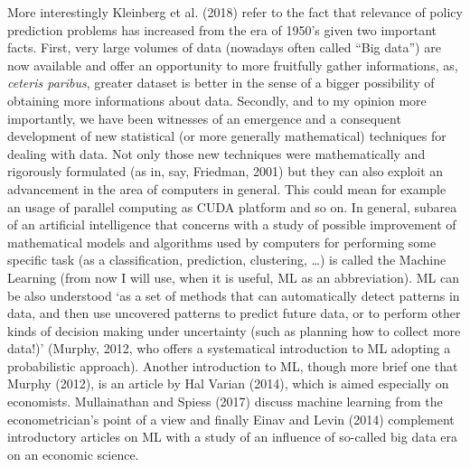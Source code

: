 \documentclass[12pt, twoside,openany]{book} %
\begin{document}
More interestingly Kleinberg et al. (2018) refer to the fact that relevance of policy prediction problems has increased from the era of 1950's given two important facts. First, very large volumes of data (nowadays often called “Big data”) are now available and offer an opportunity to more fruitfully gather informations, as, \textit{ceteris paribus}, greater dataset is better in the sense of a bigger possibility of obtaining more informations about data. Secondly, and to my opinion more importantly, we have been witnesses of an emergence and a consequent development of new statistical (or more generally mathematical) techniques for dealing with data. Not only those new techniques were mathematically and rigorously formulated (as in, say, Friedman, 2001) but they can also exploit an advancement in the area of computers in general. This could mean for example an usage of parallel computing as CUDA platform and so on. In general, subarea of an artificial intelligence that concerns with a study of possible improvement of mathematical models and algorithms used by computers for performing some specific task (as a classification, prediction, clustering, \ldots) is called the Machine Learning (from now I will use, when it is useful, ML as an abbreviation). ML can be also understood ‘as a set of methods that can automatically detect patterns in data, and then use uncovered patterns to predict future data, or to perform other kinds of decision making under uncertainty (such as planning how to collect more data!)’ (Murphy, 2012, who offers a systematical introduction to ML adopting a probabilistic approach). Another introduction to ML, though more brief one that Murphy (2012), is an article by Hal Varian (2014), which is aimed especially on economists. Mullainathan and Spiess (2017) discuss machine learning from the econometrician's point of a view and finally Einav and Levin (2014) complement introductory articles on ML with a study of an influence of so-called big data era on an economic science. \newline
\end{document}
